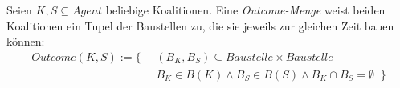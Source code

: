 \begin{definition}
  Seien $K, S \subseteq Agent$ beliebige Koalitionen. Eine \textit{Outcome-Menge} weist beiden Koalitionen ein Tupel der Baustellen zu, die sie jeweils zur gleichen Zeit bauen können:
\begin{align}
  Outcome(K,S) := \{ \; \;
  &(B_K,B_S)\subseteq Baustelle\times Baustelle\ | \\
  &B_K\in B(K) \land B_S\in B(S)\land B_K\cap B_S =\emptyset \;\;\}
\end{align}
\end{definition}

\noindent
%
%
%
%
